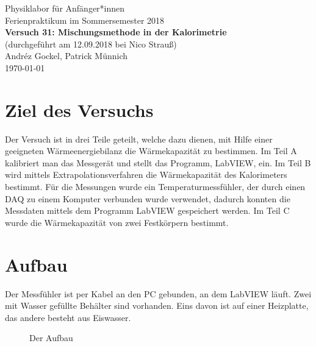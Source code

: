 \documentclass[11pt,a4paper]{article}
\begin{document}
{
\centering 
\large 
Physiklabor für Anf\"anger*innen \\
Ferienpraktikum im Sommersemester 2018 \\[4mm]
\textbf{\LARGE 
Versuch 31: Mischungsmethode in der Kalorimetrie
} \\[3mm]
(durchgef\"uhrt am 12.09.2018 bei Nico Strauß) \\
Andréz Gockel, Patrick M\"unnich\\
\today \\[10mm]
}

\tableofcontents

\pagebreak

\section{Ziel des Versuchs}


Der Versuch ist in drei Teile geteilt, welche dazu dienen, mit Hilfe einer geeigneten Wärmeenergiebilanz die Wärmekapazität zu bestimmen. Im Teil A kalibriert man das Messgerät und stellt das Programm, LabVIEW, ein. Im Teil B wird mittels Extrapolationsverfahren die Wärmekapazität des Kalorimeters bestimmt. Für die Messungen wurde ein Temperaturmessfühler, der durch einen DAQ zu einem Komputer verbunden wurde verwendet, dadurch konnten die Messdaten mittels dem Programm LabVIEW gespeichert werden. Im Teil C wurde die Wärmekapazität von zwei Festkörpern bestimmt. 

\section{Aufbau}

Der Messf\"uhler ist per Kabel an den PC gebunden, an dem LabVIEW l\"auft. Zwei mit Wasser gef\"ullte Beh\"alter sind vorhanden. Eins davon ist auf einer Heizplatte, das andere besteht aus Eiswasser.

\begin{figure}[ht!]
	\centering
  	\renewcommand\thefigure{B1}
	\caption{Der Aufbau}
	\label{Bild:1}
\end{figure}
\end{document}
